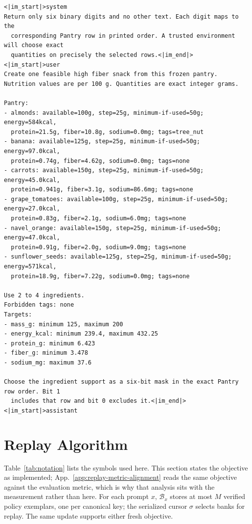 \documentclass{article}
\newcommand{\1}{\mathbf 1}
\theoremstyle{remark}
\theoremstyle{definition}
\theoremstyle{plain}
\begin{document}
\begin{Verbatim}[fontsize=\scriptsize,frame=single,framesep=4pt,rulecolor=\color{black!25},samepage=false]
<|im_start|>system
Return only six binary digits and no other text. Each digit maps to the
  corresponding Pantry row in printed order. A trusted environment will choose exact
  quantities on precisely the selected rows.<|im_end|>
<|im_start|>user
Create one feasible high fiber snack from this frozen pantry.
Nutrition values are per 100 g. Quantities are exact integer grams.

Pantry:
- almonds: available=100g, step=25g, minimum-if-used=50g; energy=584kcal,
  protein=21.5g, fiber=10.8g, sodium=0.0mg; tags=tree_nut
- banana: available=125g, step=25g, minimum-if-used=50g; energy=97.0kcal,
  protein=0.74g, fiber=4.62g, sodium=0.0mg; tags=none
- carrots: available=150g, step=25g, minimum-if-used=50g; energy=45.0kcal,
  protein=0.941g, fiber=3.1g, sodium=86.6mg; tags=none
- grape_tomatoes: available=100g, step=25g, minimum-if-used=50g; energy=27.0kcal,
  protein=0.83g, fiber=2.1g, sodium=6.0mg; tags=none
- navel_orange: available=150g, step=25g, minimum-if-used=50g; energy=47.0kcal,
  protein=0.91g, fiber=2.0g, sodium=9.0mg; tags=none
- sunflower_seeds: available=125g, step=25g, minimum-if-used=50g; energy=571kcal,
  protein=18.9g, fiber=7.22g, sodium=0.0mg; tags=none

Use 2 to 4 ingredients.
Forbidden tags: none
Targets:
- mass_g: minimum 125, maximum 200
- energy_kcal: minimum 239.4, maximum 432.25
- protein_g: minimum 6.423
- fiber_g: minimum 3.478
- sodium_mg: maximum 37.6

Choose the ingredient support as a six-bit mask in the exact Pantry row order. Bit 1
  includes that row and bit 0 excludes it.<|im_end|>
<|im_start|>assistant
\end{Verbatim}



\section{Replay Algorithm}
\label{app:algorithm}

Table~\ref{tab:notation} lists the symbols used here. This section states the
objective as implemented; App.~\ref{app:replay-metric-alignment} reads the same
objective against the evaluation metric, which is why that analysis sits with
the measurement rather than here.
For each prompt $x$, $\mathcal B_x$ stores at most $M$ verified policy
exemplars, one per canonical key; the serialized cursor $\sigma$ selects
banks for replay. The same update supports either fresh objective.
\end{document}
